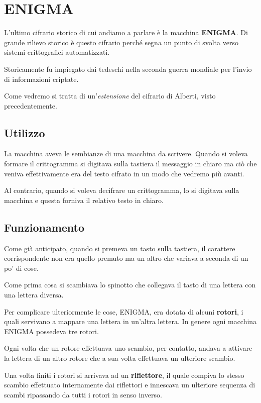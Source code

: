 \section{ENIGMA}\label{ENIGMA}
L'ultimo cifrario storico di cui andiamo a parlare \`e la macchina \textbf{ENIGMA}. Di grande rilievo storico \`e questo
cifrario perch\'e segna un punto di svolta verso sistemi crittografici automatizzati.

Storicamente fu impiegato dai tedeschi nella seconda guerra mondiale per l'invio di informazioni criptate.

Come vedremo si tratta di un'\emph{estensione} del cifrario di Alberti, visto precedentemente.

\subsection{Utilizzo}
La macchina aveva le sembianze di una macchina da scrivere. Quando si voleva formare il crittogramma si digitava sulla
tastiera il messaggio in chiaro ma ci\`o che veniva effettivamente era del testo cifrato in un modo che vedremo pi\`u
avanti.

Al contrario, quando si voleva decifrare un crittogramma, lo si digitava sulla macchina e questa forniva il relativo testo
in chiaro.

\subsection{Funzionamento}
Come gi\`a anticipato, quando si premeva un tasto sulla tastiera, il carattere corrispondente non era quello premuto ma
un altro che variava a seconda di un po' di cose.

Come prima cosa si scambiava lo spinotto che collegava il tasto di una lettera con una lettera diversa.

Per complicare ulteriormente le cose, ENIGMA, era dotata di alcuni \textbf{rotori}, i quali servivano a mappare una
lettera in un'altra lettera. In genere ogni macchina ENIGMA possedeva tre rotori.

Ogni volta che un rotore effettuava uno scambio, per contatto, andava a attivare la lettera di un altro rotore che a sua
volta effettuava un ulteriore scambio.

Una volta finiti i rotori si arrivava ad un \textbf{riflettore}, il quale compiva lo stesso scambio effettuato internamente
dai riflettori e innescava un ulteriore sequenza di scambi ripassando da tutti i rotori in senso inverso.

